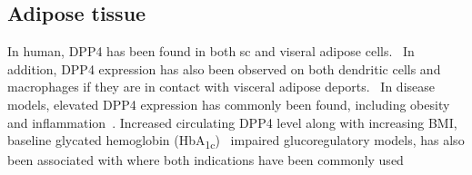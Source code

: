 \subsection{Adipose tissue}
In human, DPP4 has been found in both sc and viseral adipose cells.~\cite{Lamers2011} In addition, DPP4 expression has also been observed on both dendritic cells and macrophages if they are in contact with visceral adipose deports.~\cite{Zhong2013} In disease models, elevated DPP4 expression has commonly been found, including obesity and inflammation~\cite{Zhong2013}. Increased circulating DPP4 level along with increasing BMI, baseline glycated hemoglobin (HbA\textsubscript{1c})~\cite{2011}  impaired glucoregulatory models,  has also been associated with where both indications have been commonly used 